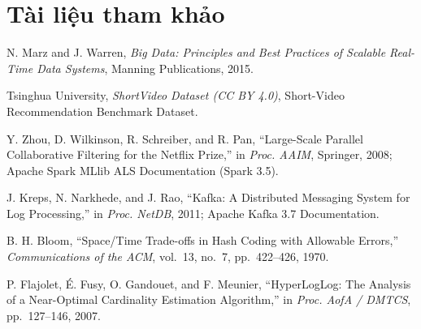 \documentclass[vietnamese,final]{hcmut-thesis}
\begin{document}
\chapter*{Tài liệu tham khảo}
\begin{enumerate}[label={[\arabic*]}, leftmargin=2.2em, itemsep=0.4em]
  \item N. Marz and J. Warren, \textit{Big Data: Principles and Best Practices of Scalable Real-Time Data Systems}, Manning Publications, 2015.
  \item Tsinghua University, \textit{ShortVideo Dataset (CC BY 4.0)}, Short-Video Recommendation Benchmark Dataset.
  \item Y. Zhou, D. Wilkinson, R. Schreiber, and R. Pan, ``Large-Scale Parallel Collaborative Filtering for the Netflix Prize,'' in \textit{Proc. AAIM}, Springer, 2008; Apache Spark MLlib ALS Documentation (Spark 3.5).
  \item J. Kreps, N. Narkhede, and J. Rao, ``Kafka: A Distributed Messaging System for Log Processing,'' in \textit{Proc. NetDB}, 2011; Apache Kafka 3.7 Documentation.
  \item B. H. Bloom, ``Space/Time Trade-offs in Hash Coding with Allowable Errors,'' \textit{Communications of the ACM}, vol.~13, no.~7, pp.~422--426, 1970.
  \item P. Flajolet, \'E. Fusy, O. Gandouet, and F. Meunier, ``HyperLogLog: The Analysis of a Near-Optimal Cardinality Estimation Algorithm,'' in \textit{Proc. AofA / DMTCS}, pp.~127--146, 2007.
\end{enumerate}
\end{document}
